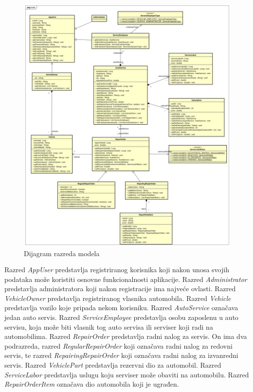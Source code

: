 		
		\begin{figure}[H]
			\centering
			\includegraphics[width=1.0\linewidth]{dijagrami/class_diagram}
			\caption{Dijagram razreda modela}
			\label{fig:classdiagram}
		\end{figure}
	
		Razred \textit{AppUser} predstavlja registriranog korisnika koji nakon unosa svojih podataka može koristiti osnovne funkcionalnosti aplikacije. Razred \textit{Administrator} predstavlja administratora koji nakon registracije ima najveće ovlasti. Razred \textit{VehicleOwner} predstavlja registriranog vlasnika automobila. Razred \textit{Vehicle} predstavlja vozilo koje pripada nekom korisniku. Razred \textit{AutoService} označava jedan auto servis. Razred \textit{ServiceEmployee} predstavlja osobu zaposlenu u auto servisu, koja može biti vlasnik tog auto servisa ili serviser koji radi na automobilima. Razred \textit{RepairOrder} predstavlja radni nalog za servis. On ima dva podrazreda, razred \textit{RegularRepairOrder} koji označava radni nalog za redovni servis, te razred \textit{RepairingRepairOrder} koji označava radni nalog za izvanredni servis. Razred \textit{VehiclePart} predstavlja rezervni dio za automobil. Razred \textit{ServiceLabor} predstavlja uslugu koju serviser može obaviti na automobilu. Razred \textit{RepairOrderItem} označava dio automobila koji je ugrađen.
		
